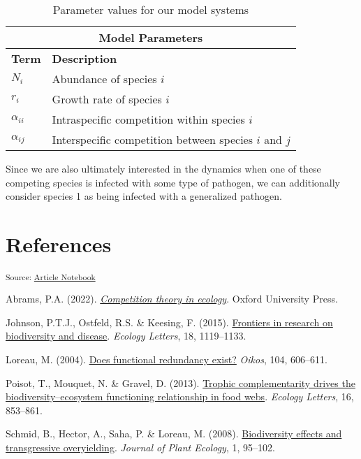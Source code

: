 \documentclass[
  letterpaper,
  DIV=11,
  numbers=noendperiod]{scrartcl}
\newlength{\cslhangindent}
\newenvironment{CSLReferences}[2] %
 {\begin{list}{}{%
  \setlength{\itemindent}{0pt}
  \setlength{\leftmargin}{0pt}
  \setlength{\parsep}{0pt}
  \ifodd #1
   \setlength{\leftmargin}{\cslhangindent}
   \setlength{\itemindent}{-1\cslhangindent}
  \fi
  \setlength{\itemsep}{#2\baselineskip}}}
 {\end{list}}
\begin{document}
\begin{table}[hpt]
\centering
\begin{tabular}{ |m{4cm}||m{7cm}|}
     \hline
     \multicolumn{2}{|c|}{Model Parameters} \\
     \hline
     \textbf{Term} & \textbf{Description} \\
     \hline
     $N_i$ & Abundance of species $i$ \\
     $r_i$ & Growth rate of species $i$ \\
     $\alpha_{ii}$ & Intraspecific competition within species $i$ \\
     $\alpha_{ij}$ & Interspecific competition between species $i$ and $j$ \\
     \hline
\end{tabular}
\caption{Parameter values for our model systems}
\label{table:parameters}
\end{table}

Since we are also ultimately interested in the dynamics when one of
these competing species is infected with some type of pathogen, we can
additionally consider species 1 as being infected with a generalized
pathogen.

\section{References}

\textsubscript{Source:
\href{https://colebrookson.github.io/disease-overyield/index.qmd.html}{Article
Notebook}}

\label{refs}
\begin{CSLReferences}{1}{0}
Abrams, P.A. (2022).
\emph{\href{https://books.google.ca/books?hl=en&lr=&id=fTaFEAAAQBAJ&oi=fnd&pg=PP1&dq=abrams+2022+competition+theory&ots=_cdJwLVcq_&sig=ZUB2hKd4WD_YZsynGVHu114pnJ4}{Competition
theory in ecology}}. Oxford University Press.

Johnson, P.T.J., Ostfeld, R.S. \& Keesing, F. (2015).
\href{https://doi.org/10.1111/ele.12479}{Frontiers in research on
biodiversity and disease}. \emph{Ecology Letters}, 18, 1119--1133.

Loreau, M. (2004).
\href{https://doi.org/10.1111/j.0030-1299.2004.12685.x}{Does functional
redundancy exist?} \emph{Oikos}, 104, 606--611.

Poisot, T., Mouquet, N. \& Gravel, D. (2013).
\href{https://doi.org/10.1111/ele.12118}{Trophic complementarity drives
the biodiversity--ecosystem functioning relationship in food webs}.
\emph{Ecology Letters}, 16, 853--861.

Schmid, B., Hector, A., Saha, P. \& Loreau, M. (2008).
\href{https://academic.oup.com/jpe/article-abstract/1/2/95/989985}{Biodiversity
effects and transgressive overyielding}. \emph{Journal of Plant
Ecology}, 1, 95--102.

\end{CSLReferences}
\end{document}

